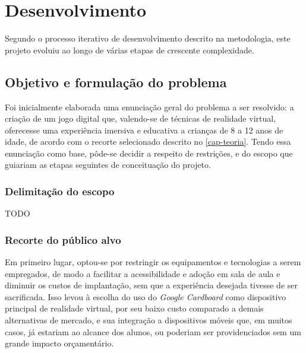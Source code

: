 
\chapter{Desenvolvimento}\label{cap-desenvolvimento}

Segundo o processo iterativo de desenvolvimento descrito na metodologia, 
este projeto evoluiu ao longo de várias etapas de crescente complexidade.


\section{Objetivo e formulação do problema}\label{sec-objetivos-formulacao-problema}

Foi inicialmente elaborada uma enunciação geral do problema a ser resolvido: 
a criação de um jogo digital que, valendo-se de técnicas de realidade 
virtual, oferecesse uma experiência imersiva e educativa a crianças de 8 a 12 
anos de idade, de acordo com o recorte selecionado descrito no \autoref{cap-teoria}.
Tendo essa enunciação como base, pôde-se decidir a respeito de restrições, e 
do escopo que guiariam as etapas seguintes de conceituação do projeto.

\subsection{Delimitação do escopo}\label{subsec-delimitacao-escopo}
TODO

\subsection{Recorte do público alvo}\label{subsec-recorte-publico-alvo}

Em primeiro lugar, optou-se por restringir os equipamentos e tecnologias a 
serem empregados, de modo a facilitar a acessibilidade e adoção em sala de aula 
e diminuir os custos de implantação, sem que a experiência desejada tivesse de 
ser sacrificada. Isso levou à escolha do uso do \textit{Google Cardboard} 
como dispositivo principal de realidade virtual, por seu baixo custo comparado 
a demais alternativas de mercado, e sua integração a dispositivos móveis que, 
em muitos casos, já estariam ao alcance dos alunos, ou poderiam ser 
providenciados sem um grande impacto orçamentário.

